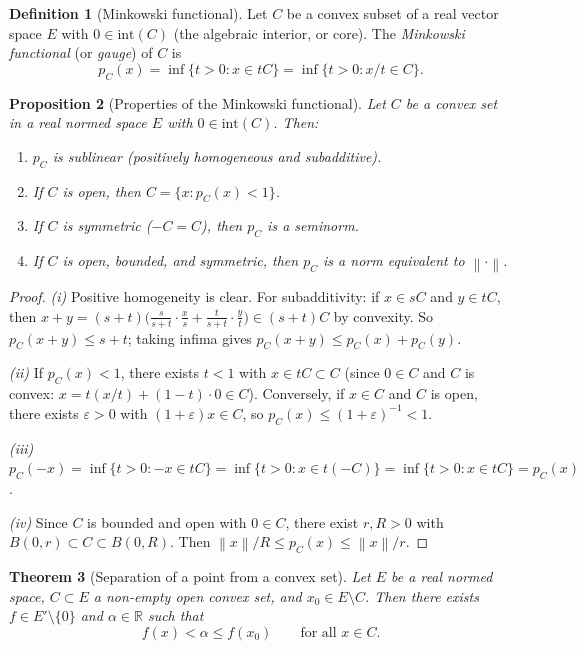 \documentclass[a4paper,12pt]{book}
\newcommand{\R}{\mathbb{R}}
\newcommand{\norm}[1]{\left\| #1 \right\|}
\theoremstyle{definition}
\newtheorem{definition}{Definition}[chapter]
\theoremstyle{plain}
\newtheorem{theorem}[definition]{Theorem}
\newtheorem{proposition}[definition]{Proposition}
\theoremstyle{remark}
\begin{document}
\begin{definition}[Minkowski functional]\label{def:minkowski-functional}
Let $C$ be a convex subset of a real vector space $E$ with $0\in\mathrm{int}(C)$
(the algebraic interior, or core). The \emph{Minkowski functional} (or
\emph{gauge}) of $C$ is
\[
  p_C(x) = \inf\{t>0 : x\in tC\} = \inf\bigl\{t>0 : x/t\in C\bigr\}.
\]
\end{definition}

\begin{proposition}[Properties of the Minkowski functional]
\label{prop:minkowski-props}
Let $C$ be a convex set in a real normed space $E$ with $0\in\mathrm{int}(C)$.
Then:
\begin{enumerate}[label=(\roman*)]
  \item $p_C$ is sublinear (positively homogeneous and subadditive).
  \item If $C$ is open, then $C = \{x : p_C(x)<1\}$.
  \item If $C$ is symmetric ($-C=C$), then $p_C$ is a seminorm.
  \item If $C$ is open, bounded, and symmetric, then $p_C$ is a norm equivalent
        to $\norm{\cdot}$.
\end{enumerate}
\end{proposition}

\begin{proof}
\emph{(i)} Positive homogeneity is clear. For subadditivity: if $x\in sC$ and
$y\in tC$, then $x+y = (s+t)\bigl(\frac{s}{s+t}\cdot\frac{x}{s}+\frac{t}{s+t}
\cdot\frac{y}{t}\bigr)\in(s+t)C$ by convexity. So $p_C(x+y)\leq s+t$; taking
infima gives $p_C(x+y)\leq p_C(x)+p_C(y)$.

\emph{(ii)} If $p_C(x)<1$, there exists $t<1$ with $x\in tC\subset C$ (since
$0\in C$ and $C$ is convex: $x = t(x/t)+(1-t)\cdot 0\in C$). Conversely, if
$x\in C$ and $C$ is open, there exists $\varepsilon>0$ with
$(1+\varepsilon)x\in C$, so $p_C(x)\leq(1+\varepsilon)^{-1}<1$.

\emph{(iii)} $p_C(-x) = \inf\{t>0:-x\in tC\}=\inf\{t>0:x\in t(-C)\}=\inf\{t>0:x\in tC\}=p_C(x)$.

\emph{(iv)} Since $C$ is bounded and open with $0\in C$, there exist $r,R>0$ with
$B(0,r)\subset C\subset B(0,R)$. Then $\norm{x}/R\leq p_C(x)\leq\norm{x}/r$.
\end{proof}

\begin{theorem}[Separation of a point from a convex set]
\label{thm:separation-point-convex}
Let $E$ be a real normed space, $C\subset E$ a non-empty open convex set, and
$x_0\in E\setminus C$. Then there exists $f\in E'\setminus\{0\}$ and
$\alpha\in\R$ such that
\[
  f(x) < \alpha \leq f(x_0) \qquad\text{for all } x\in C.
\]
\end{theorem}
\end{document}

